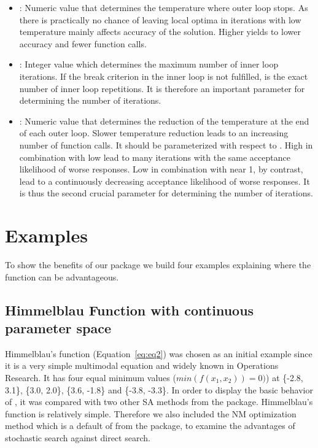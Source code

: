 \begin{itemize}
\item {}: Numeric value that determines the temperature where outer loop stops. As there is practically no chance of leaving local optima in iterations with low temperature  mainly affects accuracy of the solution. Higher  yields to lower accuracy and fewer function calls.
\item {}: Integer value which determines the maximum number of inner loop iterations. If  the break criterion in the inner loop is not fulfilled,  is the exact number of inner loop repetitions. It is therefore an important parameter for determining the number of iterations.
\item {}: Numeric value that determines the reduction of the temperature at the end of each outer loop. Slower temperature reduction leads to an increasing number of function calls. It should be parameterized with respect to . High  in combination with low  lead to many iterations with the same acceptance likelihood of worse responses. Low  in combination with  near 1, by contrast, lead to a continuously decreasing acceptance likelihood of worse responses. It is thus the second crucial parameter for determining the number of iterations.
\end{itemize}

\section{Examples}
To show the benefits of our  package we build four examples explaining where the  function can be advantageous.

\subsection{Himmelblau Function with continuous parameter space}
Himmelblau’s function (Equation~\eqref{eq:eq2}) \citep{himmelblau_1972} was chosen as an initial example since it is a very simple multimodal equation and widely known in Operations Research. It has four equal minimum values ($min(f(x_1,x_2))=0)$) at \{-2.8, 3.1\}, \{3.0, 2.0\}, \{3.6, -1.8\} and \{-3.8, -3.3\}. In order to display the basic behavior of , it was compared with two other SA methods from the  package. Himmelblau’s function is relatively simple. Therefore we also included the NM optimization method \citep{nelder_1965} which is a default of  from the  package, to examine the advantages of stochastic search against direct search.

